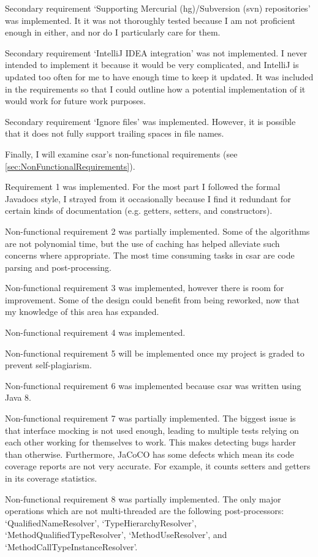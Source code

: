 \documentclass[12pt, letterpaper]{article}
\begin{document}
Secondary requirement `Supporting Mercurial (hg)/Subversion (svn) repositories' was implemented.
It it was not thoroughly tested because I am not proficient enough in either, and nor do I particularly care for them.

Secondary requirement `IntelliJ IDEA integration' was not implemented.
I never intended to implement it because it would be very complicated, and IntelliJ is updated too often for me to have enough time to keep it updated.
It was included in the requirements so that I could outline how a potential implementation of it would work for future work purposes.

Secondary requirement `Ignore files' was implemented.
However, it is possible that it does not fully support trailing spaces in file names.

Finally, I will examine csar's non-functional requirements (see \ref{sec:NonFunctionalRequirements}).

Requirement 1 was implemented.
For the most part I followed the formal Javadocs style, I strayed from it occasionally because I find it redundant for certain kinds of documentation (e.g. getters, setters, and constructors).

Non-functional requirement 2 was partially implemented.
Some of the algorithms are not polynomial time, but the use of caching has helped alleviate such concerns where appropriate.
The most time consuming tasks in csar are code parsing and post-processing.

Non-functional requirement 3 was implemented, however there is room for improvement.
Some of the design could benefit from being reworked, now that my knowledge of this area has expanded.

Non-functional requirement 4 was implemented.

Non-functional requirement 5 will be implemented once my project is graded to prevent self-plagiarism.

Non-functional requirement 6 was implemented because csar was written using Java 8.

Non-functional requirement 7 was partially implemented.
The biggest issue is that interface mocking is not used enough, leading to multiple tests relying on each other working for themselves to work.
This makes detecting bugs harder than otherwise.
Furthermore, JaCoCO has some defects which mean its code coverage reports are not very accurate.
For example, it counts setters and getters in its coverage statistics.

Non-functional requirement 8 was partially implemented.
The only major operations which are not multi-threaded are the following post-processors: `QualifiedNameResolver', `TypeHierarchyResolver', `MethodQualifiedTypeResolver', `MethodUseResolver', and `MethodCallTypeInstanceResolver'.
\end{document}
